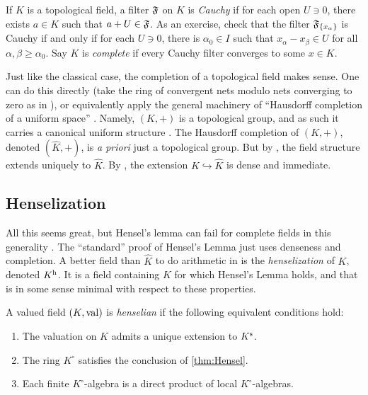 If $K$ is a topological field, a filter $\mathfrak{F}$ on $K$ is \emph{Cauchy} if for 
each open $U\ni 0$, there exists $a\in K$ such that $a+U\in \mathfrak{F}$. As an 
exercise, check that the filter $\mathfrak{F}_{\{x_\alpha\}}$ is Cauchy if and only if 
for each $U\ni 0$, there is $\alpha_0\in I$ such that 
$x_\alpha-x_\beta\in U$ for all $\alpha,\beta\geqslant \alpha_0$. Say $K$ is 
\emph{complete} if every Cauchy filter converges to some $x\in K$. 

Just like the classical case, the completion of a topological field makes 
sense. One can do this directly (take the ring of convergent nets modulo nets 
converging to zero as in \cite[2.4.3]{engler-prestel}), or equivalently apply 
the general machinery of ``Hausdorff completion of a uniform space'' 
\cite[II \S 3.7]{bourbaki-gentop1}. Namely, $(K,+)$ is a topological group, 
and as such it carries a canonical uniform structure 
\cite[III \S 3]{bourbaki-gentop1}. The Hausdorff completion of $(K,+)$, denoted 
$(\widehat K,+)$, is \emph{a priori} just a topological group. But by 
\cite[III \S 6.8]{bourbaki-gentop1}, the field structure extends uniquely to 
$\widehat K$. By \cite[2.4.4]{engler-prestel}, the extension 
$K\hookrightarrow \widehat K$ is dense and immediate.


\subsection{Henselization}

All this seems great, but Hensel's lemma can fail for complete fields in this 
generality \cite[2.4.6]{engler-prestel}. The ``standard'' proof of Hensel's 
Lemma just uses denseness and completion. A better field than $\widehat K$ to 
do arithmetic in is the \emph{henselization} of $K$, denoted 
$K^{\mathrm{h}}$. It is a field containing $K$ for which Hensel's Lemma 
holds, and that is in some sense minimal with respect to these properties. 

\begin{definition}
A valued field $(K,\operatorname{val})$ is \emph{henselian} if the following equivalent 
conditions hold:
\begin{enumerate}
\item
The valuation on $K$ admits a unique extension to $K^{\mathrm{s}}$. 

\item
The ring $K^\circ$ satisfies the conclusion of \autoref{thm:Hensel}. 

\item
Each finite $K^\circ$-algebra is a direct product of local $K^\circ$-algebras. 
\end{enumerate}
\end{definition}

